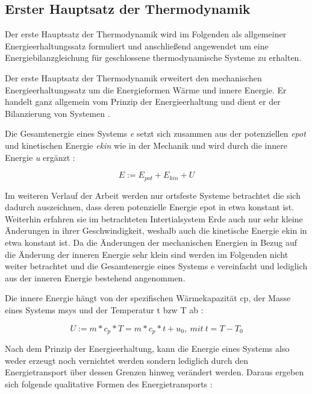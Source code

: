 \subsection{Erster Hauptsatz der Thermodynamik}
Der erste Hauptsatz der Thermodynamik wird im Folgenden als allgemeiner Energieerhaltungssatz formuliert und anschließend angewendet um eine Energiebilanzgleichung für geschlossene thermodynamische Systeme zu erhalten.

Der erste Hauptsatz der Thermodynamik erweitert den mechanischen Energieerhaltungssatz um die Energieformen Wärme und innere Energie. Er handelt ganz allgemein vom Prinzip der Energieerhaltung und  dient er der Bilanzierung von Systemen \cite[S.~43]{ba12}.

Die Gesamtenergie eines Systems \textit{\gls{e}} setzt sich zusammen aus der potenziellen \textit{\gls{epot}} und kinetischen Energie \textit{\gls{ekin}} wie in der Mechanik und wird durch die innere Energie \textit{ \gls{u}} ergänzt \cite[S.~49]{ba12}:

\begin{equation}
\label{eq:energie}
E := E_{pot} + E_{kin} + U
\end{equation}

Im weiteren Verlauf der Arbeit werden nur ortsfeste Systeme betrachtet die sich dadurch auszeichnen, dass deren potenzielle Energie  \gls{epot} in etwa konstant ist. Weiterhin erfahren sie im betrachteten Intertialsystem Erde auch nur sehr kleine Änderungen in ihrer Geschwindigkeit, weshalb auch die kinetische Energie \gls{ekin} in etwa konstant ist.  Da die Änderungen der mechanischen Energien in Bezug auf die Änderung der inneren Energie sehr klein sind werden im Folgenden nicht weiter betrachtet und die Gesamtenergie eines Systems \gls{e} vereinfacht und lediglich aus der inneren Energie bestehend angenommen.

Die innere Energie hängt von der spezifischen Wärmekapazität \gls{cp}, der Masse eines Systems \gls{msys} und der Temperatur \gls{t} \acrlong{bzw} \gls{T} ab \cite[S.~54]{ba12}:

\begin{equation}
\label{eq:innereenergie}
U := m*c_p*T=m*c_p*t+u_0,~mit~t=T-T_0
\end{equation}

Nach dem Prinzip der Energieerhaltung, kann die Energie eines Systems also weder erzeugt noch vernichtet werden sondern lediglich durch den Energietransport über dessen Grenzen hinweg verändert werden. Daraus ergeben sich folgende qualitative Formen des Energietransports \cite[S.~48f.]{ba12}:

